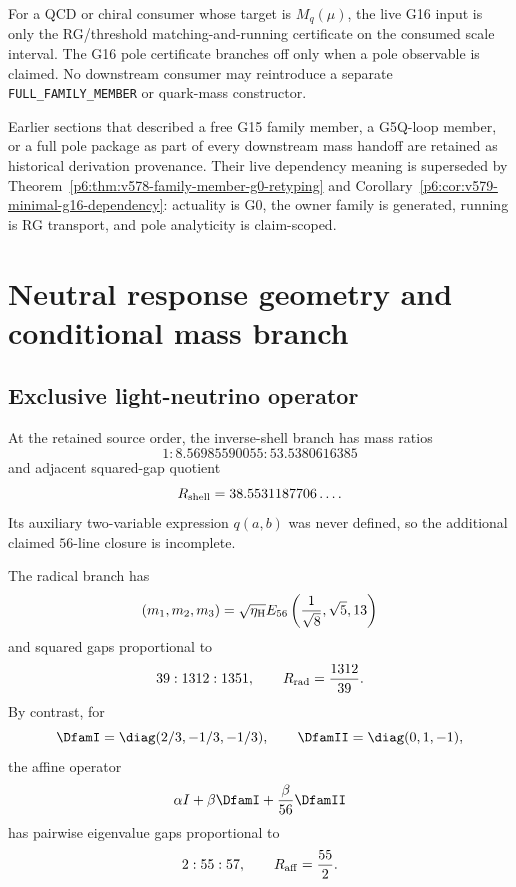 \documentclass[12pt,a4paper]{article}
\newcommand{\etaH}{\eta_{\rm H}}
\begin{document}
\begin{corollary}
\label{p6:cor:v579-minimal-g16-dependency}
For a QCD or chiral consumer whose target is \(M_q(\mu)\), the live G16 input is
only the RG/threshold matching-and-running certificate on the consumed scale
interval.  The G16 pole certificate branches off only when a pole observable is
claimed.  No downstream consumer may reintroduce a separate
\texttt{FULL\_FAMILY\_MEMBER} or quark-mass constructor.
\end{corollary}

\begin{remark}
\label{p6:rem:v579-historical-live-package-superseded}
Earlier sections that described a free G15 family member, a G5Q-loop member, or
a full pole package as part of every downstream mass handoff are retained as
historical derivation provenance.  Their live dependency meaning is superseded
by Theorem~\ref{p6:thm:v578-family-member-g0-retyping} and
Corollary~\ref{p6:cor:v579-minimal-g16-dependency}: actuality is G0, the owner
family is generated, running is RG transport, and pole analyticity is
claim-scoped.
\end{remark}


\section{Neutral response geometry and conditional mass branch}
\label{p5b:sec:organized-neutral}
\subsection{Exclusive light-neutrino operator}
\label{p6:sec:exclusive-neutrino}

\begin{proposition}
\label{p6:prop:inverse-shell-neutrino}
At the retained source order, the inverse-shell branch has mass ratios
\[
1:8.56985590055:53.5380616385
\]
and adjacent squared-gap quotient
\[
R_{\rm shell}=38.5531187706\ldots .
\]
Its auxiliary two-variable expression \(q(a,b)\) was never defined, so the
additional claimed \(56\)-line closure is incomplete.
\end{proposition}

\begin{proposition}
\label{p6:prop:radical-affine-neutrino}
The radical branch has
\[
(m_1,m_2,m_3)
=
\sqrt{\etaH}E_{56}
\left(\frac1{\sqrt8},\sqrt5,13\right)
\]
and squared gaps proportional to
\[
39:1312:1351,
\qquad
R_{\rm rad}=\frac{1312}{39}.
\]
By contrast, for
\[
\DfamI=\diag(2/3,-1/3,-1/3),
\qquad
\DfamII=\diag(0,1,-1),
\]
the affine operator
\[
\alpha I+\beta\DfamI+\frac{\beta}{56}\DfamII
\]
has pairwise eigenvalue gaps proportional to
\[
2:55:57,
\qquad
R_{\rm aff}=\frac{55}{2}.
\]
\end{proposition}
\end{document}
